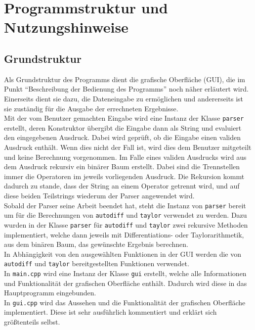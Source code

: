 \documentclass{scrartcl}
\begin{document}
\newpage
\section{Programmstruktur und Nutzungshinweise}

	\subsection{Grundstruktur}
Als Grundstruktur des Programms dient die grafische Oberfläche (GUI), die im Punkt "`Beschreibung der Bedienung des Programms"' noch näher erläutert wird. Einerseits \mbox{dient} sie dazu, die Dateneingabe zu ermöglichen und andererseits ist sie zuständig für die Ausgabe der errechneten Ergebnisse.\\
Mit der vom Benutzer gemachten Eingabe wird eine Instanz der Klasse \texttt{parser} erstellt, deren Konstruktor übergibt die Eingabe dann als String und evaluiert den eingegebenen Ausdruck. Dabei wird geprüft, ob die Eingabe einen validen Ausdruck enthält. Wenn dies nicht der Fall ist, wird dies dem Benutzer mitgeteilt und keine Berechnung vorgenommen. Im Falle eines validen Ausdrucks wird aus dem Ausdruck rekursiv ein binärer Baum erstellt. Dabei sind die Trennstellen immer die Operatoren im jeweils vorliegenden Ausdruck. Die Rekursion kommt dadurch zu stande, dass der String an einem Operator getrennt wird, und auf diese beiden Teilstrings wiederum der Parser angewendet wird.\\
Sobald der Parser seine Arbeit beendet hat, steht die Instanz von \texttt{parser} bereit um für die Berechnungen von \texttt{autodiff} und \texttt{taylor} verwendet zu werden. Dazu wurden in der Klasse \texttt{parser} für \texttt{autodiff} und \texttt{taylor} zwei rekursive Methoden implementiert, welche dann jeweils mit Differentiations- oder Taylorarithmetik, aus dem binären Baum, das gewünschte Ergebnis berechnen.\\
In Abhängigkeit von den ausgewählten Funktionen in der GUI werden die von \texttt{autodiff} und \texttt{taylor} bereitgestellten Funktionen verwendet.\\
In \texttt{main.cpp} wird eine Instanz der Klasse \texttt{gui} erstellt, welche alle Informationen und Funktionalität der grafischen Oberfläche enthält. Dadurch wird diese in das Hauptprogramm eingebunden.\\
In \texttt{gui.cpp} wird das Aussehen und die Funktionalität der grafischen Oberfläche implementiert. Diese ist sehr ausführlich kommentiert und erklärt sich größtenteils selbst.
\end{document}
